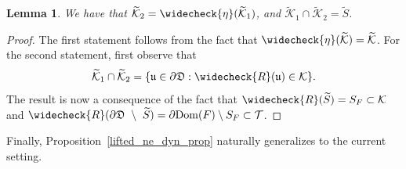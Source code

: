 \documentclass[JEP,XML,SOM,Unicode,NoFloatCountersInSection,published]{cedram}
\newtheorem{lemma}{Lemma}[section]
\theoremstyle{definition}
\theoremstyle{remark}
\begin{document}
\begin{lemma}\label{lifted_ne_top_1_lem}
We have that $\widetilde{\mathcal{K}}_2=\widecheck{\eta}(\widetilde{\mathcal{K}}_1)$, and $\widetilde{\mathcal{K}}_1\cap\widetilde{\mathcal{K}}_2=\widetilde{S}$.
\end{lemma}
\begin{proof}
The first statement follows from the fact that $\widecheck{\eta}(\widetilde{\mathcal{K}})=\widetilde{\mathcal{K}}$.
For the second statement, first observe that
\[
\widetilde{\mathcal{K}}_1\cap\widetilde{\mathcal{K}}_2=\{\mathfrak{u}\in\partial\mathfrak{D}: \widecheck{R}(\mathfrak{u})\in\mathcal{K}\}.
\]
The result is now a consequence of the fact that $\widecheck{R}(\widetilde{S})=S_F\subset\mathcal{K}$ and $\widecheck{R}(\partial\mathfrak{D}\ \setminus\ \widetilde{S})=\partial\mathrm{Dom}(F) \setminus S_F\subset\mathcal{T}$.
\end{proof}

Finally, Proposition~\ref{lifted_ne_dyn_prop} naturally generalizes to the current setting.
\end{document}
